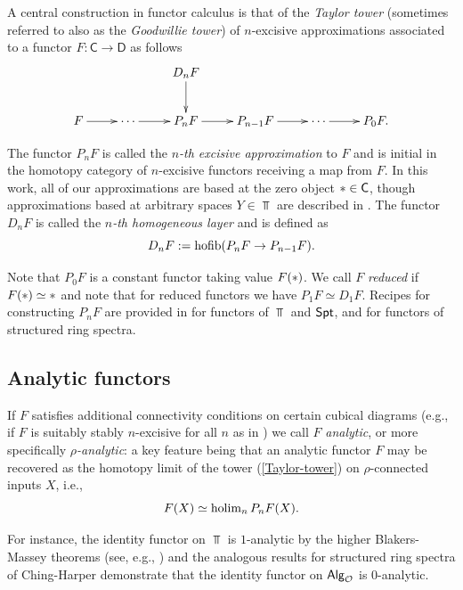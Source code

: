 A central construction in functor calculus is that of the \textit{Taylor tower} (sometimes referred to also as the \textit{Goodwillie tower}) of $n$-excisive approximations associated to a  functor $F\colon \mathsf{C}\to\mathsf{D}$ as follows
\begin{equation}\label{Taylor-tower}
    \xymatrix{
    & & D_nF\ar[d] & &&\\
    F\ar[r] & \cdots \ar[r] & P_nF \ar[r] & P_{n-1}F \ar[r] & \cdots \ar[r] & P_0F.}
\end{equation}

The functor $P_nF$ is called the \textit{$n$-th excisive approximation} to $F$ and is initial in the homotopy category of $n$-excisive functors receiving a map from $F$. In this work, all of our approximations are based at the zero object $* \in \mathsf{C}$, though approximations based at arbitrary spaces $Y\in \Top$ are described in \cite{Goo-Calc3}. The functor $D_n F$ is called the \textit{$n$-th homogeneous layer} and is defined as \[D_nF :=\operatorname{hofib}(P_nF\to P_{n-1}F).\]

Note that $P_0F$ is a constant functor taking value $F(*)$. We call $F$ \textit{reduced} if $F(*)\simeq *$ and note that for reduced functors we have $P_1F\simeq D_1F$. Recipes for constructing $P_n F$ are provided in \cite{Goo-Calc3} for functors of $\Top$ and $\mathsf{Spt}$, and \cite{Per-thesis} for functors of structured ring spectra.



\subsection{Analytic functors}  If $F$ satisfies additional connectivity conditions on certain cubical diagrams (e.g.,  if $F$ is suitably stably $n$-excisive for all $n$ as in \cite[4.1]{Goo-Calc2}) we call $F$ \textit{analytic}, or more specifically \textit{$\rho$-analytic}: a key feature being that an analytic functor $F$ may be recovered as the homotopy limit of the tower (\ref{Taylor-tower}) on $\rho$-connected inputs $X$, i.e., \[F(X)\simeq \operatorname{holim}_{n} P_n F(X).\] 

For instance, the identity functor on $\Top$ is $1$-analytic by the higher Blakers-Massey theorems (see, e.g.,  \cite[]{Goo-Calc2}) and the analogous results for structured ring spectra of Ching-Harper \cite{Ching-Harper-BM} demonstrate that the identity functor on ${\mathsf{Alg}_{\mathcal{O}}}$ is $0$-analytic. %

